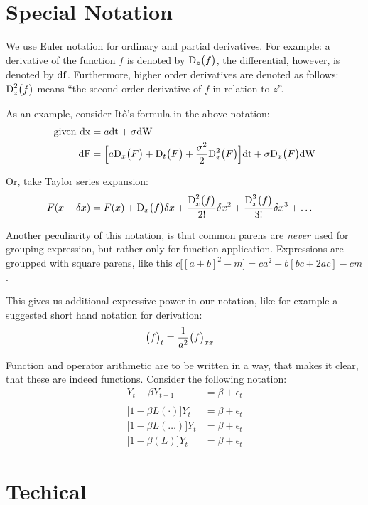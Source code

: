 \documentclass{article}
\begin{document}
\section{Special Notation}
We use Euler notation for ordinary and partial derivatives. For example: a derivative of the function $f$ is denoted by $\df[z]{f}$, the differential, however, is denoted by ${\rm{df}}$. Furthermore, higher order derivatives are denoted as follows: $\ddf[z]{f}$ means ``the second order derivative of $f$ in relation to $z$''.

As an example, consider It\^o's formula in the above notation:
\begin{align*}
	\text{given } \dif{x} &= a\dif{t} + \sigma\dif{W} \\
	\dif{F} &= {\Big[a\df{F} + \df[t]{F} + \frac{\sigma^2}{2}\ddf{F}\Big]
		\dif{t} + \sigma\df{F}\dif{W}}
\end{align*}

Or, take Taylor series expansion:
\begin{align*}
	F(x + \delta{}x) &= {F(x) + \df{f}\delta{}x + 
		\frac{\ddf{f}}{2!} \delta{}x^2 + 
		\frac{\dddf{f}}{3!}\delta{}x^3 + \dots}
\end{align*}

Another peculiarity of this notation, is that common parens are \emph{never} used for
grouping expression, but rather only for function application. Expressions are groupped with square parens, like this $c\big[[a+b]^2 - m\big] = ca^2 + b[bc + 2ac] - cm$.

This gives us additional expressive power in our notation, like for example a suggested short hand notation for derivation:
\begin{align*}
	\ds[t]{f} &= \frac{1}{a^2}\dds{f}
\end{align*}

Function and operator arithmetic are to be written in a way, that makes it clear, that these are indeed functions. Consider the following notation:
\begin{align*}
	Y_t - \beta{}Y_{t-1} &= \beta + \epsilon_{t} \\
	\\
	\big[1 - \beta{}L(\cdot)\big]Y_t &= \beta + \epsilon_{t} \\
	\big[1 - \beta{}L(\dots)\big]Y_t &= \beta + \epsilon_{t} \\
	\big[1 - \beta{}(L)\big]Y_t &= \beta + \epsilon_{t}
\end{align*}


\section{Techical}
\end{document}
